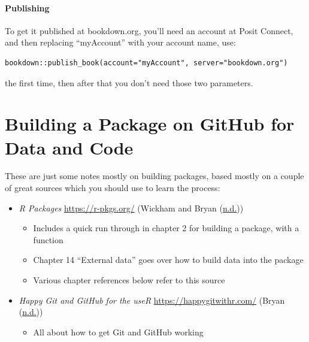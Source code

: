 \documentclass[
]{book}
\providecommand{\tightlist}{%
  \setlength{\itemsep}{0pt}\setlength{\parskip}{0pt}}
\begin{document}
\hypertarget{publishing}{%
\subsubsection{Publishing}\label{publishing}}

To get it published at bookdown.org, you'll need an account at Posit Connect, and then replacing ``myAccount'' with your account name, use:

\begin{verbatim}
bookdown::publish_book(account="myAccount", server="bookdown.org")
\end{verbatim}

the first time, then after that you don't need those two parameters.

\hypertarget{building-a-package-on-github-for-data-and-code}{%
\chapter{Building a Package on GitHub for Data and Code}\label{building-a-package-on-github-for-data-and-code}}

These are just some notes mostly on building packages, based mostly on a couple of great sources which you should use to learn the process:

\begin{itemize}
\item
  \emph{R Packages} \url{https://r-pkgs.org/} (Wickham and Bryan (\protect\hyperlink{ref-r-pkgs}{n.d.}))

  \begin{itemize}
  \tightlist
  \item
    Includes a quick run through in chapter 2 for building a package, with a function
  \item
    Chapter 14 ``External data'' goes over how to build data into the package
  \item
    Various chapter references below refer to this source
  \end{itemize}
\item
  \emph{Happy Git and GitHub for the useR} \url{https://happygitwithr.com/} (Bryan (\protect\hyperlink{ref-happygitwithr}{n.d.}))

  \begin{itemize}
  \tightlist
  \item
    All about how to get Git and GitHub working
  \end{itemize}
\end{itemize}
\end{document}
